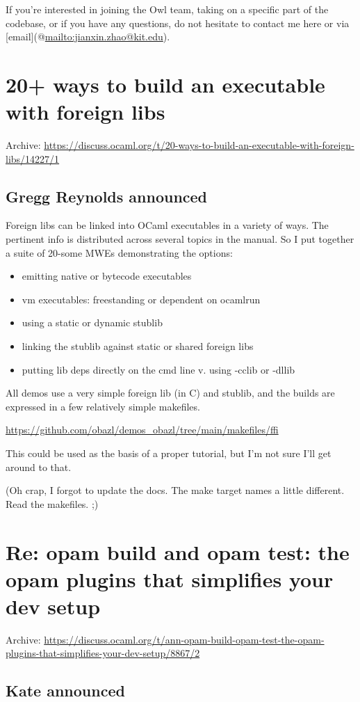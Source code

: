 \documentclass[11pt]{article}
\begin{document}
If you're interested in joining the Owl team, taking on a specific part of the codebase, or if you have any
questions, do not hesitate to contact me here or via [email](@\url{mailto:jianxin.zhao@kit.edu}).
\section*{20+ ways to build an executable with foreign libs}
\label{10}
Archive: \url{https://discuss.ocaml.org/t/20-ways-to-build-an-executable-with-foreign-libs/14227/1}
\subsection*{Gregg Reynolds announced}
\label{sec:org1c9f146}


Foreign libs can be linked into OCaml executables in a variety of ways. The pertinent info is distributed across
several topics in the manual.  So I put together a suite of 20-some MWEs demonstrating the options:

\begin{itemize}
\item emitting native or bytecode executables
\item vm executables: freestanding or dependent on ocamlrun
\item using a static or dynamic stublib
\item linking the stublib against static or shared foreign libs
\item putting lib deps directly on the cmd line v. using -cclib or -dllib
\end{itemize}

All demos use a very simple foreign lib (in C) and stublib, and the builds are expressed in a few relatively simple
makefiles.

\url{https://github.com/obazl/demos\_obazl/tree/main/makefiles/ffi}

This could be used as the basis of a proper tutorial, but I'm not sure I'll get around to that.

(Oh crap, I forgot to update the docs. The make target names a little different. Read the makefiles. ;)
\section*{Re: opam build and opam test: the opam plugins that simplifies your dev setup}
\label{11}
Archive: \url{https://discuss.ocaml.org/t/ann-opam-build-opam-test-the-opam-plugins-that-simplifies-your-dev-setup/8867/2}
\subsection*{Kate announced}
\label{sec:orgdfe15a2}
\end{document}
